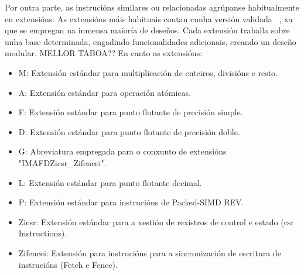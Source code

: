 Por outra parte, as instrucións similares ou relacionadas agrúpanse habitualmente en extensións. As extensións máis habituais contan cunha versión validada ~\cite{ratified_extensions}, xa que se empregan na inmensa maioría de deseños. Cada extensión traballa sobre unha base determinada, engadindo funcionalidades adicionais, creando un deseño modular. 
MELLOR TABOA??
En canto as extensións: 
\begin{itemize}
    \item M: Extensión estándar para multiplicación de enteiros, divisións e resto.
    \item A: Extensión estándar para operación atómicas.
    \item F: Extensión estándar para punto flotante de precisión simple.
    \item D: Extensión estándar para punto flotante de precisión doble.
    \item G: Abreviatura empregada para o conxunto de extensións "IMAFDZicsr\_Zifencei".
    \item L: Extensión estándar para punto flotante decimal.
    \item P: Extensión estándar para instrucións de Packed-SIMD REV.
    \item Zicsr: Extensión estándar para a xestión de rexistros de control e estado (\acrfull{csr} Instructions).
    \item Zifencei: Extensión para instrucións para a sincronización de escritura de instrucións (Fetch e Fence).
\end{itemize}
